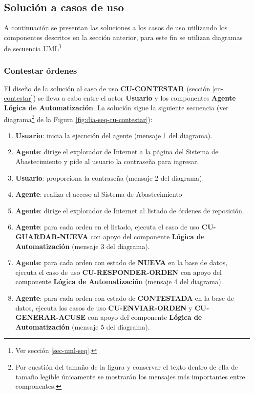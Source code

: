 \subsection{Solución a casos de uso}
A continuación se presentan las soluciones a los casos de uso utilizando los componentes descritos en la sección anterior, para este fin se utilizan diagramas de secuencia UML\footnote{Ver sección \ref{sec-uml-seq}.}

\subsubsection{Contestar órdenes}
El diseño de la solución al caso de uso \textbf{CU-CONTESTAR} (sección \ref{cu-contestar}) se lleva a cabo entre el actor \textbf{Usuario} y los componentes \textbf{Agente} \textbf{Lógica de Automatización}. La solución sigue la siguiente secuencia (ver diagrama\footnote{Por cuestión del tamaño de la figura y conservar el texto dentro de ella de tamaño legible únicamente se mostrarán los mensajes más importantes entre componentes.} de la Figura \ref{fig:dia-seq-cu-contestar}):
\begin{enumerate}
	\item \textbf{Usuario}: inicia la ejecución del agente (mensaje 1 del diagrama).
	\item \textbf{Agente}: dirige el explorador de Internet a la página del Sistema de Abastecimiento y pide al usuario la contraseña para ingresar.
	\item \textbf{Usuario}: proporciona la contraseña (mensaje 2 del diagrama).
	\item \textbf{Agente}: realiza el acceso al Sistema de Abastecimiento
	\item \textbf{Agente}: dirige el explorador de Internet al listado de órdenes de reposición.
	\item \textbf{Agente}: para cada orden en el listado, ejecuta el caso de uso \textbf{CU-GUARDAR-NUEVA} con apoyo del componente \textbf{Lógica de Automatización} (mensaje 3 del diagrama).
	\item \textbf{Agente}: para cada orden con estado de \textbf{NUEVA} en la base de datos, ejecuta el caso de uso \textbf{CU-RESPONDER-ORDEN} con apoyo del componente \textbf{Lógica de Automatización} (mensaje 4 del diagrama).
	\item \textbf{Agente}: para cada orden con estado de \textbf{CONTESTADA} en la base de datos, ejecuta los casos de uso \textbf{CU-ENVIAR-ORDEN} y \textbf{CU-GENERAR-ACUSE} con apoyo del componente \textbf{Lógica de Automatización} (mensaje 5 del diagrama).
\end{enumerate}

